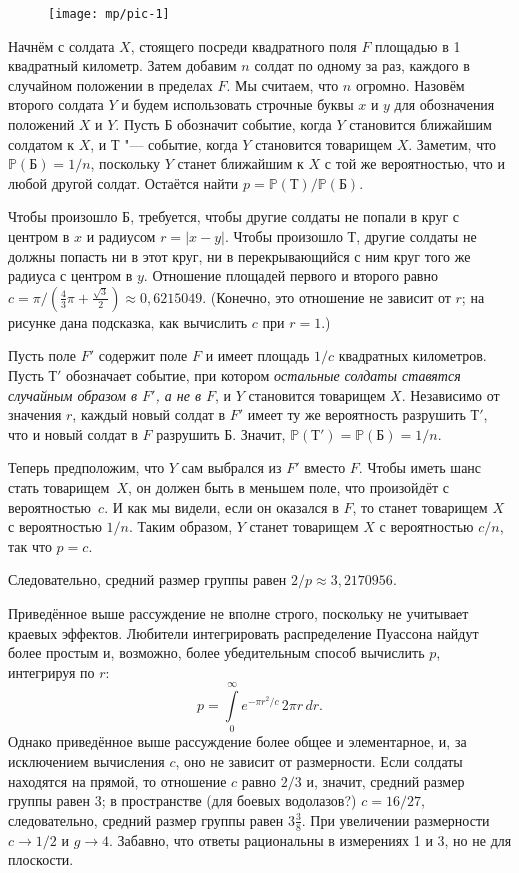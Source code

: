\documentclass[twoside]{book}
\begin{document}
\begin{figure}[!ht]
\centering
\texttt{[image: mp/pic-1]} %
\end{figure}

Начнём с солдата $X$, стоящего посреди квадратного поля $F$ площадью в 1 квадратный километр.
Затем добавим $n$ солдат по одному за раз, каждого в случайном положении в пределах $F$. 
Мы считаем, что $n$ огромно.
Назовём второго солдата $Y$ и будем использовать строчные буквы $x$ и $y$ для обозначения положений $X$ и $Y$.
Пусть $\text{Б}$ обозначит событие, когда $Y$ становится ближайшим солдатом к $X$, 
и $\text{Т}$ "--- событие, когда $Y$ становится товарищем $X$.
Заметим, что $\mathbb{P}(\text{Б})=1/n$, поскольку $Y$ станет ближайшим к $X$ с той же вероятностью, что и любой другой солдат.
Остаётся найти $p=\mathbb{P}(\text{Т})/\mathbb{P}(\text{Б})$.

Чтобы произошло $\text{Б}$, требуется, чтобы другие солдаты не попали в круг с центром в $x$ и радиусом $r=|x-y|$.
Чтобы произошло $\text{Т}$, другие солдаты не должны попасть ни в этот круг, ни в перекрывающийся с ним круг того же радиуса с центром в $y$.
Отношение площадей первого и второго  равно $c=\pi/(\tfrac43\pi+\tfrac{\sqrt{3}}{2}) \approx 0{,}6215049$.
(Конечно, это отношение не зависит от $r$; на рисунке дана подсказка, как вычислить $c$ при $r=1$.)

Пусть поле $F'$ содержит поле $F$ и имеет площадь $1/c$ квадратных километров.
Пусть $\text{Т}'$ обозначает событие, при котором \emph{остальные солдаты ставятся случайным образом в $F'$, а не в $F$}, и $Y$ становится товарищем $X$.
Независимо от значения $r$, каждый новый солдат в $F'$ имеет ту же вероятность разрушить $\text{Т}'$, что и новый солдат в $F$ разрушить $\text{Б}$. 
Значит, $\mathbb{P}(\text{Т}')= \mathbb{P}(\text{Б}) = 1/n$.

Теперь предположим, что $Y$ сам выбрался из $F'$ вместо $F$.
Чтобы иметь шанс стать товарищем~$X$, он должен быть в меньшем поле, что произойдёт с вероятностью~$c$.
И как мы видели, если он оказался в $F$, то станет товарищем $X$ с вероятностью $1/n$.
Таким образом, $Y$ станет товарищем $X$ с вероятностью $c/n$, так что $p=c$.

Следовательно, средний размер группы равен $2/p\approx3{,}2170956$.
\heart

Приведённое выше рассуждение не вполне строго, поскольку не учитывает краевых эффектов.
Любители интегрировать распределение Пуассона 
найдут более простым и, возможно, более убедительным способ вычислить $p$, интегрируя по $r$:
\[p=\int\limits_0^\infty e^{-\pi r^2/c}\,2\pi r\, dr.\]
Однако приведённое выше рассуждение более общее и элементарное, и, за исключением вычисления $c$, оно не зависит от размерности.
Если солдаты находятся на прямой, то отношение $c$ равно $2/3$ и, значит, средний размер группы равен 3;
в пространстве (для боевых водолазов?) $c = 16/27$, следовательно, средний размер группы равен $3\tfrac38$.
При увеличении размерности $c\to 1/2$ и $g\to 4$. 
Забавно, что ответы рациональны в измерениях 1 и 3, но не для плоскости.
\end{document}
